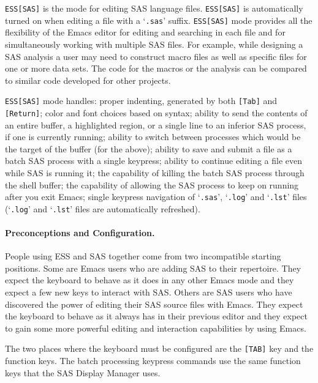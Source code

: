 \documentclass{article}
\newcommand{\stexttt}[1]{{\small\texttt{#1}}}
\newcommand{\file}[1]{`\stexttt{#1}'}
\begin{document}
\stexttt{ESS[SAS]} is the mode for editing SAS language files.
\stexttt{ESS[SAS]} is automatically turned on when editing a file with
a \file{.sas} suffix.  \stexttt{ESS[SAS]} mode provides all the
flexibility of the Emacs editor for editing and searching in each file
and for simultaneously working with multiple SAS files.  For example,
while designing a SAS analysis a user may need to construct macro
files as well as specific files for one or more data sets.  The code
for the macros or the analysis can be compared to similar code
developed for other projects.

\stexttt{ESS[SAS]} mode handles: proper indenting, generated by both
\stexttt{[Tab]} and \stexttt{[Return]}; color and font choices based
on syntax; ability to send the contents of an entire buffer, a
highlighted region, or a single line to an inferior SAS process, if
one is currently running; ability to switch between processes which
would be the target of the buffer (for the above); ability to save and
submit a file as a batch SAS process with a single keypress; ability
to continue editing a file even while SAS is running it; the
capability of killing the batch SAS process through the shell buffer;
the capability of allowing the SAS process to keep on running after
you exit Emacs; single keypress navigation of \file{.sas}, \file{.log}
and \file{.lst} files (\file{.log} and \file{.lst} files are
automatically refreshed).


\paragraph{Preconceptions and Configuration.}

People using ESS and SAS together come from two incompatible starting
positions.  Some are Emacs users who are adding SAS to their
repertoire.  They expect the keyboard to behave as it does in any
other Emacs mode and they expect a few new keys to interact with SAS.
Others are SAS users who have discovered the power of editing their
SAS source files with Emacs.  They expect the keyboard to behave as it
always has in their previous editor and they expect to gain some more
powerful editing and interaction capabilities by using Emacs.

The two places where the keyboard must be configured are the
\texttt{[TAB]} key and the function keys.  The batch processing
keypress commands use the same function keys that the SAS Display
Manager uses.
\end{document}
